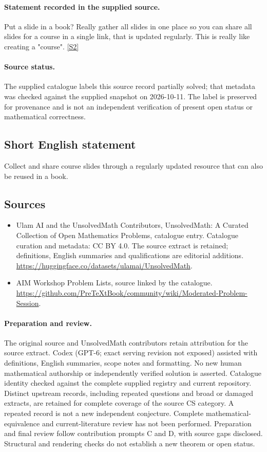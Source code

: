 \documentclass[11pt]{article}
\begin{document}
\paragraph{Statement recorded in the supplied source.}
Put a slide in a book? Really gather all slides in one place so you can share all slides for a course in a single link, that is updated regularly. This is really like creating a "course". \href{https://github.com/PreTeXtBook/community/wiki/Moderated-Problem-Session}{[S2]}
\paragraph{Source status.}
The supplied catalogue labels this source record partially solved; that metadata was checked against the supplied snapshot on 2026-10-11. The label is preserved for provenance and is not an independent verification of present open status or mathematical correctness.
\subsection{Short English statement}
Collect and share course slides through a regularly updated resource that can also be reused in a book.
\subsection{Sources}
\begin{itemize}
\item[S1] Ulam AI and the UnsolvedMath Contributors, UnsolvedMath: A Curated Collection of Open Mathematics Problems, catalogue entry. Catalogue curation and metadata: CC BY 4.0. The source extract is retained; definitions, English summaries and qualifications are editorial additions.
\url{https://huggingface.co/datasets/ulamai/UnsolvedMath}.
\item[S2] AIM Workshop Problem Lists, source linked by the catalogue.
\url{https://github.com/PreTeXtBook/community/wiki/Moderated-Problem-Session}.
\end{itemize}
\paragraph{Preparation and review.}
The original source and UnsolvedMath contributors retain attribution for the source extract. Codex (GPT-6; exact serving revision not exposed) assisted with definitions, English summaries, scope notes and formatting. No new human mathematical authorship or independently verified solution is asserted. Catalogue identity checked against the complete supplied registry and current repository. Distinct upstream records, including repeated questions and broad or damaged extracts, are retained for complete coverage of the source CS category. A repeated record is not a new independent conjecture. Complete mathematical-equivalence and current-literature review has not been performed. Preparation and final review follow contribution prompts C and D, with source gaps disclosed. Structural and rendering checks do not establish a new theorem or open status.
\label{end:statement}
\end{document}
